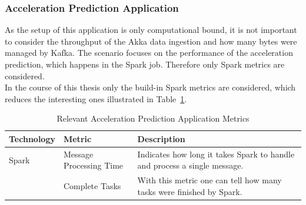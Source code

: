 \subsubsection{Acceleration Prediction Application}
\label{sec:evaluation_prediction_application}
As the setup of this application is only computational bound, it is not important to consider the throughput of the Akka data ingestion and how many bytes were managed by Kafka.
The scenario focuses on the performance of the acceleration prediction, which happens in the Spark job.
Therefore only Spark metrics are considered.\\
In the course of this thesis only the build-in Spark metrics are considered, which reduces the interesting ones illustrated in Table~\ref{tab:metrics_prediction}.\\


\begin{table}[]
\begin{tabular}{lp{5cm}p{8cm}}
\toprule
Technology & Metric & Description \\ \midrule
Spark & Message Processing Time & Indicates how long it takes Spark to handle and process a single message.\\
      & Complete Tasks & With this metric one can tell how many tasks were finished by Spark.\\
\bottomrule
\end{tabular}
\centering
\caption{Relevant Acceleration Prediction Application Metrics}
\label{tab:metrics_prediction}
\end{table}


